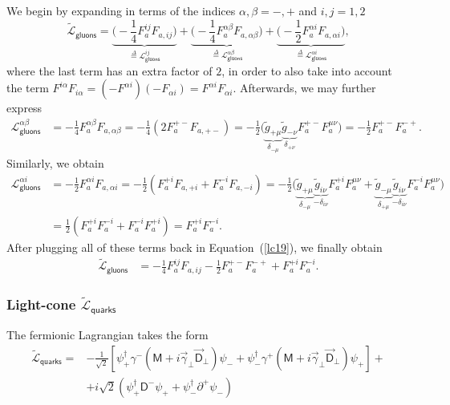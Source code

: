 \begin{note}\noindent
We begin by expanding in terms of the indices $\alpha,\beta=-,+$ and $i,j=1,2$ 
\begin{equation}\label{lc19}
\widetilde{\mathcal{L}}_{\textsf{gluons}}=\underbrace{\Big(-\frac{1}{4}F^{ij}_aF_{a,ij}\Big)}_{\overset{\Delta}{=}\mathcal{L}_{\textsf{gluons}}^{ij}}+\underbrace{\Big(-\frac{1}{4}F^{\alpha\beta}_aF_{a,\alpha\beta}\Big)}_{\overset{\Delta}{=}\mathcal{L}_{\textsf{gluons}}^{\alpha\beta}}+\underbrace{\Big(-\frac{1}{2}F^{\alpha i}_aF_{a,\alpha i}\Big)}_{\overset{\Delta}{=}\mathcal{L}_{\textsf{gluons}}^{\alpha i}},
\end{equation}
where the last term has an extra factor of $2$, in order to also take into account the term $F^{i\alpha}F_{i\alpha}=(-F^{\alpha i})(-F_{\alpha i})=F^{\alpha i}F_{\alpha i}$.
Afterwards, we may further express
\begin{align*}
\mathcal{L}_{\textsf{gluons}}^{\alpha\beta}&=-\frac{1}{4}F^{\alpha\beta}_aF_{a,\alpha\beta}=-\frac{1}{4}\left(2F^{+-}_aF_{a,+-}\right)=-\frac{1}{2}\Big(\underbrace{\widetilde{g}_{+\mu}}_{\delta_{-\mu}}\underbrace{\widetilde{g}_{-\nu}}_{\delta_{+\nu}}F^{+-}_aF^{\mu\nu}_a\Big)=-\frac{1}{2}F^{+-}_aF^{-+}_a.
\end{align*}
Similarly, we obtain
\begin{align*}
\mathcal{L}_{\textsf{gluons}}^{\alpha i}&=-\frac{1}{2}F^{\alpha i}_aF_{a,\alpha i}=-\frac{1}{2}\left(F^{+i}_aF_{a,+i}+F^{-i}_aF_{a,-i}\right)=-\frac{1}{2}\Big(\underbrace{\widetilde{g}_{+\mu}}_{\delta_{-\mu}}\underbrace{\widetilde{g}_{i\nu}}_{-\delta_{i\nu}}F_a^{+i}F_a^{\mu\nu}+\underbrace{\widetilde{g}_{-\mu}}_{\delta_{+\mu}}\underbrace{\widetilde{g}_{i\nu}}_{-\delta_{i\nu}}F_a^{-i}F_a^{\mu\nu}\Big)\\
&=\frac{1}{2}\left(F_a^{+i}F_a^{-i}+F_a^{-i}F_a^{+i}\right)=F_a^{+i}F_a^{-i}.
\end{align*}
After plugging all of these terms back in Equation~(\cref{lc19}), we finally obtain
\begin{align*}
\widetilde{\mathcal{L}}_{\textsf{gluons}}&=-\frac{1}{4}F^{ij}_aF_{a,ij}-\frac{1}{2}F^{+-}_aF^{-+}_a+F_a^{+i}F_a^{-i}.
\end{align*}
\end{note}

\subsubsection*{Light-cone $\widetilde{\mathcal{L}}_{\textsf{quarks}}$}
The fermionic Lagrangian takes the form
\begin{equation}\label{lc29}
\begin{aligned}
\widetilde{\mathcal{L}}_{\textsf{quarks}}=&-\frac{1}{\sqrt{2}}\left[\psi_+^\dag\gamma^-\left(\textsf{M}+i\vec{\gamma}_\perp\vec{\textsf{D}}_\perp\right)\psi_-+\psi_-^\dag\gamma^+\left(\textsf{M}+i\vec{\gamma}_\perp\vec{\textsf{D}}_\perp\right)\psi_+\right]+\\
&+i\sqrt{2}\left(\psi_+^\dag\textsf{D}^-\psi_++\psi_-^\dag\partial^+\psi_-\right)
\end{aligned}
\end{equation}

